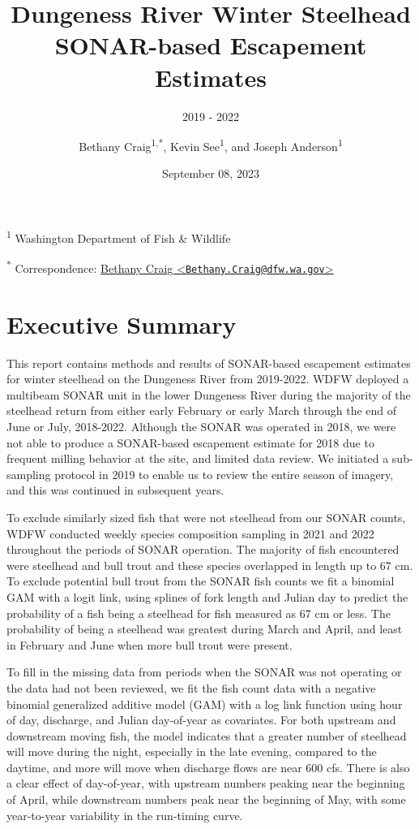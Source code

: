\documentclass[
]{article}
\title{Dungeness River Winter Steelhead SONAR-based Escapement Estimates}
\subtitle{2019 - 2022}
\author{Bethany Craig\textsuperscript{1,*}, Kevin See\textsuperscript{1}, and Joseph Anderson\textsuperscript{1}}
\date{September 08, 2023}
\begin{document}
\maketitle

{
\setcounter{tocdepth}{2}
\tableofcontents
}
\textsuperscript{1} Washington Department of Fish \& Wildlife

\textsuperscript{*} Correspondence: \href{mailto:Bethany.Craig@dfw.wa.gov}{Bethany Craig \textless{}\href{mailto:Bethany.Craig@dfw.wa.gov}{\nolinkurl{Bethany.Craig@dfw.wa.gov}}\textgreater{}}

\newpage

\hypertarget{executive-summary}{%
\section{Executive Summary}\label{executive-summary}}

This report contains methods and results of SONAR-based escapement estimates for winter steelhead on the Dungeness River from 2019-2022. WDFW deployed a multibeam SONAR unit in the lower Dungeness River during the majority of the steelhead return from either early February or early March through the end of June or July, 2018-2022. Although the SONAR was operated in 2018, we were not able to produce a SONAR-based escapement estimate for 2018 due to frequent milling behavior at the site, and limited data review. We initiated a sub-sampling protocol in 2019 to enable us to review the entire season of imagery, and this was continued in subsequent years.

To exclude similarly sized fish that were not steelhead from our SONAR counts, WDFW conducted weekly species composition sampling in 2021 and 2022 throughout the periods of SONAR operation. The majority of fish encountered were steelhead and bull trout and these species overlapped in length up to 67 cm. To exclude potential bull trout from the SONAR fish counts we fit a binomial GAM with a logit link, using splines of fork length and Julian day to predict the probability of a fish being a steelhead for fish measured as 67 cm or less. The probability of being a steelhead was greatest during March and April, and least in February and June when more bull trout were present.

To fill in the missing data from periods when the SONAR was not operating or the data had not been reviewed, we fit the fish count data with a negative binomial generalized additive model (GAM) with a log link function using hour of day, discharge, and Julian day-of-year as covariates. For both upstream and downstream moving fish, the model indicates that a greater number of steelhead will move during the night, especially in the late evening, compared to the daytime, and more will move when discharge flows are near 600 cfs. There is also a clear effect of day-of-year, with upstream numbers peaking near the beginning of April, while downstream numbers peak near the beginning of May, with some year-to-year variability in the run-timing curve.
\end{document}

